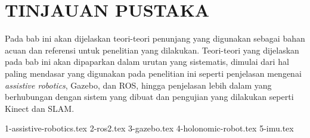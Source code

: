 \chapter{TINJAUAN PUSTAKA}
\label{chap:tinjauanpustaka}

Pada bab ini akan dijelaskan teori-teori penunjang yang digunakan sebagai bahan acuan dan referensi untuk penelitian yang dilakukan.
Teori-teori yang dijelaskan pada bab ini akan dipaparkan dalam urutan yang sistematis,
  dimulai dari hal paling mendasar yang digunakan pada penelitian ini seperti penjelasan mengenai \emph{assistive robotics}, Gazebo, dan ROS,
  hingga penjelasan lebih dalam yang berhubungan dengan sistem yang dibuat dan pengujian yang dilakukan seperti Kinect dan SLAM.

{1-assistive-robotics.tex}
{2-ros2.tex}
{3-gazebo.tex}
{4-holonomic-robot.tex}
{5-imu.tex}
